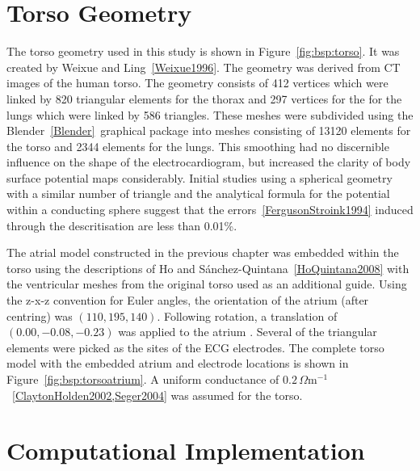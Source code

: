 \section{Torso Geometry}

The torso geometry used in this study is shown in Figure~\ref{fig:bsp:torso}.
It was created by Weixue and Ling~\ref{Weixue1996}.
The geometry was derived from CT images of the human torso.
The geometry consists of 412 vertices which were linked by 820 triangular
elements for the thorax and 297 vertices for the for the lungs which were linked
by 586 triangles.
These meshes were subdivided using the Blender~\ref{Blender}\ graphical package
into meshes consisting of 13120 elements for the torso and 2344 elements for the
lungs.
This smoothing had no discernible influence on the shape of the
electrocardiogram, but increased the clarity of body surface potential maps
considerably.
Initial studies using a spherical geometry with a similar number of triangle and
the analytical formula for the potential within a conducting sphere suggest that
the errors~\ref{FergusonStroink1994} induced through the descritisation are less
than 0.01\%.

The atrial model constructed in the previous chapter was embedded within the
torso using the descriptions of Ho and S\'{a}nchez-Quintana~\ref{HoQuintana2008}
with the ventricular meshes from the original torso used as an additional guide.
Using the z-x-z convention for Euler angles, the orientation of the atrium
(after centring) was $\left(110,195,140\right)$.
Following rotation, a translation of $\left(0.00,-0.08,-0.23\right)$ was
applied to the atrium .
Several of the triangular elements were picked as the sites of the ECG
electrodes.
The complete torso model with the embedded atrium and electrode locations is
shown in Figure~\ref{fig:bsp:torsoatrium}.
A uniform conductance of $0.2\,\Omega \text{m}^{-1}$~\ref{ClaytonHolden2002,Seger2004} was assumed for the torso.

\section{Computational Implementation}

